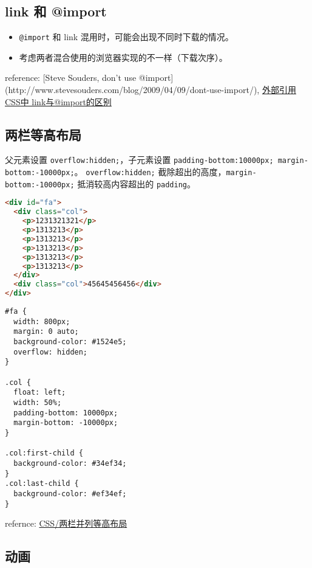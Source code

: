 \subsection{link 和 @import}\label{link-ux548c-import}

\begin{itemize}
\tightlist
\item
  \lstinline!@import! 和 link 混用时，可能会出现不同时下载的情况。
\item
  考虑两者混合使用的浏览器实现的不一样（下载次序）。
\end{itemize}

reference: {[}Steve Souders, don't use
@import{]}(http://www.stevesouders.com/blog/2009/04/09/dont-use-import/),
\href{http://www.dreamdu.com/blog/2007/05/11/css_link_import/}{外部引用CSS中
link与@import的区别}

\subsection{两栏等高布局}\label{ux4e24ux680fux7b49ux9ad8ux5e03ux5c40}

父元素设置 \lstinline!overflow:hidden;!，子元素设置
\lstinline!padding-bottom:10000px; margin-bottom:-10000px;!。
\lstinline!overflow:hidden;!
截除超出的高度，\lstinline!margin-bottom:-10000px;! 抵消较高内容超出的
\lstinline!padding!。

\begin{lstlisting}[language=HTML]
<div id="fa">
  <div class="col">
    <p>1231321321</p>
    <p>1313213</p>
    <p>1313213</p>
    <p>1313213</p>
    <p>1313213</p>
    <p>1313213</p>
  </div>
  <div class="col">45645456456</div>
</div>
\end{lstlisting}

\begin{lstlisting}
#fa {
  width: 800px;
  margin: 0 auto;
  background-color: #1524e5;
  overflow: hidden;
}

.col {
  float: left;
  width: 50%;
  padding-bottom: 10000px;
  margin-bottom: -10000px;
}

.col:first-child {
  background-color: #34ef34;
}
.col:last-child {
  background-color: #ef34ef;
}
\end{lstlisting}

refernce:
\href{http://segmentfault.com/a/1190000000625584}{CSS/两栏并列等高布局}

\subsection{动画}\label{ux52a8ux753b}

